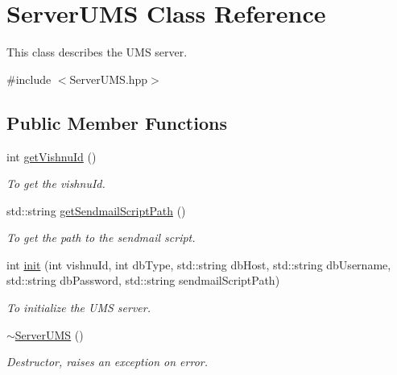 \hypertarget{classServerUMS}{
\section{ServerUMS Class Reference}
\label{classServerUMS}
}


This class describes the UMS server.  




{\ttfamily \#include $<$ServerUMS.hpp$>$}

\subsection*{Public Member Functions}
\begin{DoxyCompactItemize}
\item 
int \hyperlink{classServerUMS_a6c582b60ba1b73edef1ea5ebb920ff40}{getVishnuId} ()
\begin{DoxyCompactList}\small\item\em To get the vishnuId. \item\end{DoxyCompactList}\item 
std::string \hyperlink{classServerUMS_aa82fd34438d581fb1a3915db6d8a9bb9}{getSendmailScriptPath} ()
\begin{DoxyCompactList}\small\item\em To get the path to the sendmail script. \item\end{DoxyCompactList}\item 
int \hyperlink{classServerUMS_ae3bce55074cf688f585d6a46a9aabe23}{init} (int vishnuId, int dbType, std::string dbHost, std::string dbUsername, std::string dbPassword, std::string sendmailScriptPath)
\begin{DoxyCompactList}\small\item\em To initialize the UMS server. \item\end{DoxyCompactList}\item 
\hypertarget{classServerUMS_a9d94c92a660ecfda2930894dd4b772bf}{
\hyperlink{classServerUMS_a9d94c92a660ecfda2930894dd4b772bf}{$\sim$ServerUMS} ()}
\label{classServerUMS_a9d94c92a660ecfda2930894dd4b772bf}

\begin{DoxyCompactList}\small\item\em Destructor, raises an exception on error. \item\end{DoxyCompactList}\end{DoxyCompactItemize}
